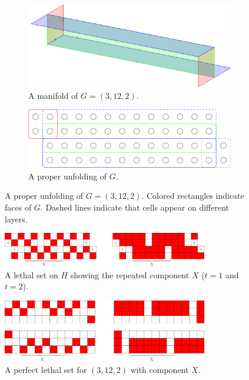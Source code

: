
\begin{figure}[]
\centering
\begin{subfigure}{0.45\textwidth}
	\includegraphics[width=\textwidth]{figures/7/3x12x2_manifold_3d.pdf}
	\caption{A manifold of $G= (3,12,2)$.}
	\label{fig:3x12x2_manifold_a}
\end{subfigure} \hfill%
\begin{subfigure}{0.45\textwidth}
	\includegraphics[width=\textwidth]{figures/7/3x12x2_manifold.pdf}
	\caption{A proper unfolding of $G$.}
	\label{fig:3x12x2_manifold_b}
\end{subfigure}
\caption{A proper unfolding of $G= (3,12,2)$. Colored rectangles indicate faces of $G$. Dashed lines indicate that cells appear on different layers. }
\label{fig:3x12x2_manifold}
\end{figure} 

\begin{figure}[]
\centering
\includegraphics[width=0.8\textwidth]{figures/7/3x12x2_unfolded_lethal.pdf}
\caption{A lethal set on $H$ showing the repeated component $X$ ($t=1$ and $t=2$).}
\label{fig:3x12x2_unfolded_lethal}
\end{figure} 

\begin{figure}[]
\centering
\includegraphics[width=0.8\textwidth]{figures/7/3x12x2.pdf}
\caption{A perfect lethal set for $(3,12,2)$ with component $X$.}
\label{fig:3x12x2}
\end{figure} 

